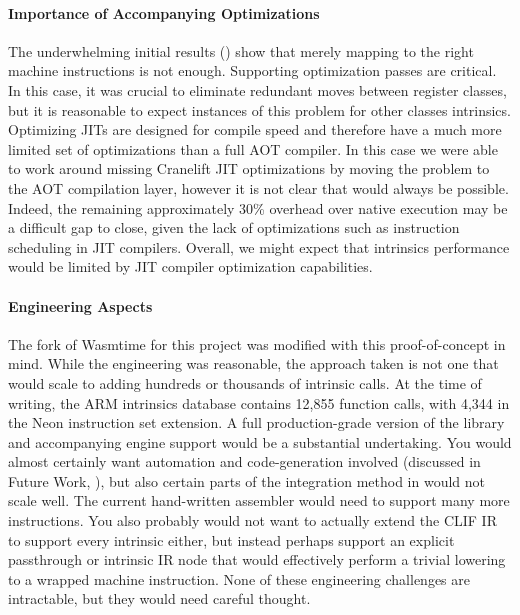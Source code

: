 \paragraph{Importance of Accompanying Optimizations}

The underwhelming initial results () show that merely
mapping to the right machine instructions is not enough. Supporting optimization
passes are critical. In this case, it was crucial to eliminate redundant moves
between register classes, but it is reasonable to expect instances of this
problem for other classes intrinsics. Optimizing JITs are designed for compile
speed and therefore have a much more limited set of optimizations than a full
AOT compiler. In this case we were able to work around missing Cranelift JIT
optimizations by moving the problem to the AOT compilation layer, however it is
not clear that would always be possible. Indeed, the remaining approximately
30\% overhead over native execution may be a difficult gap to close, given the
lack of optimizations such as instruction scheduling in JIT compilers. Overall,
we might expect that \wasm intrinsics performance would be limited by JIT
compiler optimization capabilities.

\paragraph{Engineering Aspects}

The fork of Wasmtime for this project was modified with this proof-of-concept in
mind. While the engineering was reasonable, the approach taken is not one that
would scale to adding hundreds or thousands of intrinsic calls. At the time of
writing, the ARM intrinsics database contains 12,855 function calls, with 4,344
in the Neon instruction set extension. A full production-grade version of the
 library and accompanying engine support would be a
substantial undertaking. You would almost certainly want automation and
code-generation involved (discussed in Future Work, ), but also
certain parts of the integration method in  would not scale well.
The current hand-written assembler would need to support many more instructions.
You also probably would not want to actually extend the CLIF IR to support every
intrinsic either, but instead perhaps support an explicit passthrough or
intrinsic IR node that would effectively perform a trivial lowering to a wrapped
machine instruction. None of these engineering challenges are intractable, but
they would need careful thought.
